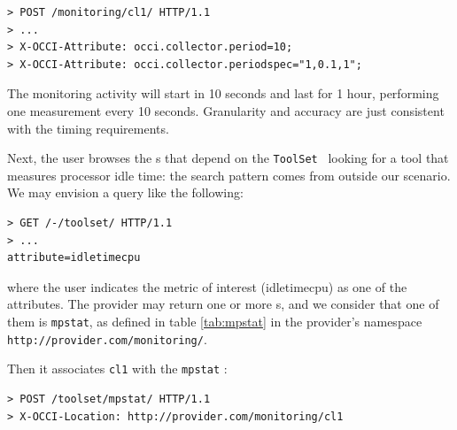 \documentclass[12pt]{article}  %
\begin{document}
\begin{verbatim}
> POST /monitoring/cl1/ HTTP/1.1
> ...
> X-OCCI-Attribute: occi.collector.period=10;
> X-OCCI-Attribute: occi.collector.periodspec="1,0.1,1";
\end{verbatim}

The monitoring activity will start in 10 seconds and last for 1 hour, performing one measurement every 10 seconds. Granularity and accuracy are just consistent with the timing requirements.

Next, the user browses the \mi s that depend on the {\tt ToolSet} \mi\ looking for a tool that measures processor idle time: the search pattern comes from outside our scenario. We may envision a query like the following:

\begin{verbatim}
> GET /-/toolset/ HTTP/1.1
> ...
attribute=idletimecpu
\end{verbatim}

where the user indicates the metric of interest (idletimecpu) as one of the attributes. The provider may return one or more \mi s, and we consider that one of them is {\tt mpstat}, as defined in table \ref{tab:mpstat} in the provider's namespace {\tt http://provider.com/monitoring/}.

\begin{table}
\scriptsize
{}

\caption{Attributes defined for the {\tt mpstat} mixin \label{tab:mpstat}}
\end {table}

Then it associates {\tt cl1} with the {\tt mpstat} \mi:

\begin{verbatim}
> POST /toolset/mpstat/ HTTP/1.1
> X-OCCI-Location: http://provider.com/monitoring/cl1
\end{verbatim}
\end{document}
